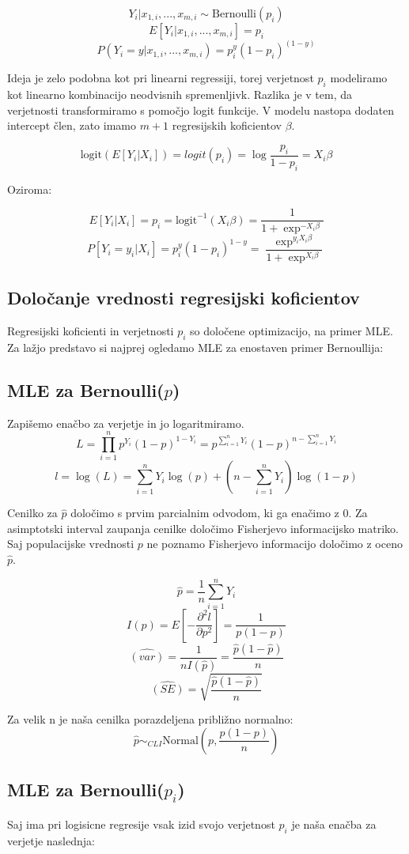 \documentclass[letterpaper,11pt]{article}
\begin{document}
$$Y_i | x_{1,i},...,x_{m,i}\sim \text{Bernoulli}(p_i)$$
$$E[Y_i | x_{1,i},...,x_{m,i}] = p_i$$
$$P(Y_i = y| x_{1,i},...,x_{m,i}) = p_i^y(1-p_i)^{(1-y)}$$


\noindent Ideja je zelo podobna kot pri linearni regressiji, torej verjetnost $p_i$ modeliramo kot linearno kombinacijo neodvisnih spremenljivk. Razlika je v tem, da verjetnosti transformiramo s pomočjo logit funkcije. V modelu nastopa dodaten intercept člen, zato imamo $m + 1$ regresijskih koficientov $\beta$.

$$\text{logit}(E[Y_i|X_i]) = logit(p_i) = \log{\frac{p_i}{1-p_i}} = X_i \beta$$

\noindent Oziroma:

$$E[Y_i|X_i] = p_i = \text{logit}^{-1}(X_i \beta) = \frac{1}{1+\exp^{-X_i \beta}}$$
$$P[Y_i = y_i|X_i] = p_i^y(1-p_i)^{1-y} = \frac{\exp^{y_i X_i \beta}}{1+\exp^{X_i \beta}}$$


\subsection{Določanje vrednosti regresijski koficientov}
Regresijski koficienti in verjetnosti $p_i$ so določene optimizacijo, na primer MLE. Za lažjo predstavo si najprej ogledamo MLE za enostaven primer Bernoullija:

\subsection{MLE za Bernoulli($p$)}
Zapišemo enačbo za verjetje in jo logaritmiramo. 
$$L = \prod_{i=1}^n p^{Y_i}(1-p)^{1-Y_i}=p^{\sum_{i=1}^n Y_i}(1-p)^{n-\sum_{i=1}^n Y_i}$$
$$l = \log{(L)} = \sum_{i=1}^n Y_i \log{(p)} + (n-\sum_{i=1}^n Y_i)\log{(1-p)}$$

\noindent Cenilko za $\hat{p}$ določimo s prvim parcialnim odvodom, ki ga enačimo z 0. Za asimptotski interval zaupanja cenilke določimo Fisherjevo informacijsko matriko. Saj populacijske vrednosti $p$ ne poznamo Fisherjevo informacijo določimo z oceno $\hat{p}$.

$$\hat{p}=\frac{1}{n}\sum_{i = 1}^n Y_i$$
$$I(p) = E[-\frac{\partial^2 l}{\partial p^2}]= \frac{1}{p(1-p)}$$
$$\hat{(var)} = \frac{1}{nI(\hat{p})} = \frac{\hat{p}(1-\hat{p})}{n}$$
$$\hat{(SE)} = \sqrt{\frac{\hat{p}(1-\hat{p})}{n}}$$

\noindent Za velik n je naša cenilka porazdeljena približno normalno:
$$\hat{p} \sim_{CLI} \text{Normal}(p, \frac{p(1-p)}{n})$$


\subsection{MLE za Bernoulli($p_i$)}
Saj ima pri logisicne regresije vsak izid svojo verjetnost $p_i$ je naša enačba za verjetje naslednja:
\end{document}
